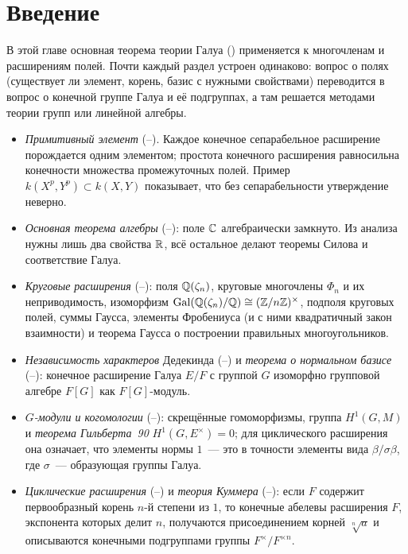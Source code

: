 \section*{Введение}

В этой главе основная теорема теории Галуа () применяется к многочленам и расширениям полей. Почти каждый раздел
устроен одинаково: вопрос о полях (существует ли элемент, корень, базис с нужными свойствами) переводится в вопрос о
конечной группе Галуа и её подгруппах, а там решается методами теории групп или линейной алгебры.

\begin{itemize}[leftmargin=*]
\item \emph{Примитивный элемент} (--). Каждое конечное сепарабельное расширение порождается одним элементом;
простота конечного расширения равносильна конечности множества промежуточных полей. Пример $k(X^p,Y^p)\subset k(X,Y)$
показывает, что без сепарабельности утверждение неверно.
\item \emph{Основная теорема алгебры} (--): поле $\mathbb C$ алгебраически замкнуто. Из анализа нужны лишь два свойства
$\mathbb R$, всё остальное делают теоремы Силова и соответствие Галуа.
\item \emph{Круговые расширения} (--): поля $\mathbb Q(\zeta_n)$, круговые многочлены $\Phi_n$ и их неприводимость,
изоморфизм $\operatorname{Gal}(\mathbb Q(\zeta_n)/\mathbb Q)\cong(\mathbb Z/n\mathbb Z)^\times$, подполя круговых полей, суммы Гаусса, элементы Фробениуса (и с ними
квадратичный закон взаимности) и теорема Гаусса о построении правильных многоугольников.
\item \emph{Независимость характеров} Дедекинда (--) и \emph{теорема о нормальном базисе} (--):
конечное расширение Галуа $E/F$ с группой $G$ изоморфно групповой алгебре $F[G]$ как $F[G]$-модуль.
\item \emph{$G$-модули и когомологии} (--): скрещённые гомоморфизмы, группа $H^1(G,M)$ и \emph{теорема
Гильберта~90} $H^1(G,E^\times)=0$; для циклического расширения она означает, что элементы нормы $1$~--- это в точности
элементы вида $\beta/\sigma\beta$, где $\sigma$~--- образующая группы Галуа.
\item \emph{Циклические расширения} (--) и \emph{теория Куммера} (--): если $F$ содержит первообразный
корень $n$-й степени из $1$, то конечные абелевы расширения $F$, экспонента которых делит $n$, получаются присоединением
корней $\sqrt[n]{a}$ и описываются конечными подгруппами группы $F^\times/F^{\times n}$.

\end{itemize}
